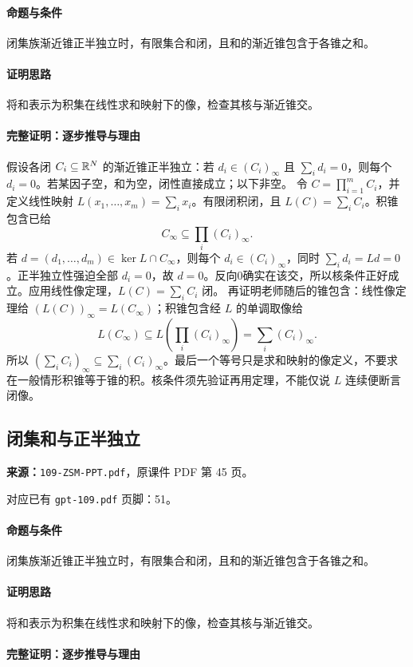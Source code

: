 \paragraph{命题与条件}闭集族渐近锥正半独立时，有限集合和闭，且和的渐近锥包含于各锥之和。
\paragraph{证明思路}将和表示为积集在线性求和映射下的像，检查其核与渐近锥交。
\paragraph{完整证明：逐步推导与理由}

假设各闭 $C_i\subseteq\mathbb{R}^N$ 的渐近锥正半独立：若 $d_i\in(C_i)_\infty$ 且 $\sum_i d_i=0$，则每个 $d_i=0$。若某因子空，和为空，闭性直接成立；以下非空。
令 $C=\prod_{i=1}^mC_i$，并定义线性映射 $L(x_1,\ldots,x_m)=\sum_i x_i$。有限闭积闭，且 $L(C)=\sum_iC_i$。积锥包含已给
\[C_\infty\subseteq\prod_i(C_i)_\infty.\]
若 $d=(d_1,\ldots,d_m)\in\ker L\cap C_\infty$，则每个 $d_i\in(C_i)_\infty$，同时 $\sum_id_i=Ld=0$。正半独立性强迫全部 $d_i=0$，故 $d=0$。反向0确实在该交，所以核条件正好成立。应用线性像定理，$L(C)=\sum_iC_i$ 闭。
再证明老师随后的锥包含：线性像定理给 $(L(C))_\infty=L(C_\infty)$；积锥包含经 $L$ 的单调取像给
\[L(C_\infty)\subseteq L\left(\prod_i(C_i)_\infty\right)=\sum_i(C_i)_\infty.\]
所以 $(\sum_iC_i)_\infty\subseteq\sum_i(C_i)_\infty$。最后一个等号只是求和映射的像定义，不要求在一般情形积锥等于锥的积。核条件须先验证再用定理，不能仅说 $L$ 连续便断言闭像。

\clearpage\subsection{闭集和与正半独立}
\textbf{来源：}\texttt{109-ZSM-PPT.pdf}，原课件 PDF 第 45 页。\par
对应已有 \texttt{gpt-109.pdf} 页脚：51。\par
\paragraph{命题与条件}闭集族渐近锥正半独立时，有限集合和闭，且和的渐近锥包含于各锥之和。
\paragraph{证明思路}将和表示为积集在线性求和映射下的像，检查其核与渐近锥交。
\paragraph{完整证明：逐步推导与理由}

